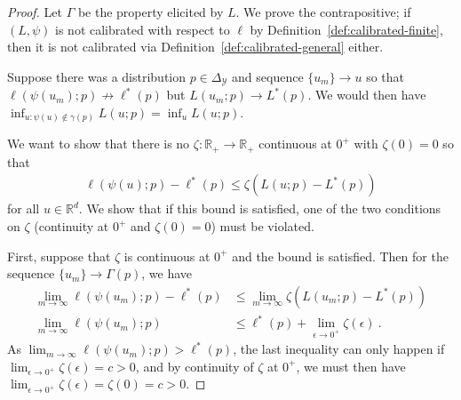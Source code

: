 \documentclass{article}
\newcommand{\reals}{\mathbb{R}}
\newcommand{\simplex}{\Delta_\Y}
\newcommand{\R}{\mathcal{R}}
\newcommand{\Y}{\mathcal{Y}}
\newcommand{\risk}[1]{#1^*}
\begin{document}
\begin{proof}
	Let $\Gamma$ be the property elicited by $L$.
	We prove the contrapositive; if $(L, \psi)$ is not calibrated with respect to $\ell$ by Definition~\ref{def:calibrated-finite}, then it is not calibrated via Definition~\ref{def:calibrated-general} either.
	
	Suppose there was a distribution $p \in \simplex$ and sequence $\{u_m\} \to u$ so that $\ell(\psi(u_m);p) \not \to \risk{\ell}(p)$ but $L(u_m;p) \to \risk{L}(p)$.
	We would then have $\inf_{u : \psi(u) \not \in \gamma(p)} L(u;p) = \inf_{u} L(u;p)$.
	
	We want to show that there is no $\zeta:\reals_+ \to \reals_+$ continuous at $0^+$ with $\zeta(0) = 0$ so that 
	\begin{align*}
	\ell(\psi(u);p) - \risk{\ell}(p) \leq \zeta(L(u;p) - \risk{L}(p))
	\end{align*}
	for all $u \in \reals^d$.
	We show that if this bound is satisfied, one of the two conditions on $\zeta$ (continuity at $0^+$ and $\zeta(0) = 0$) must be violated.
	
	
	First, suppose that $\zeta$ is continuous at $0^+$ and the bound is satisfied.
	Then for the sequence $\{u_m\} \to \Gamma(p)$, we have 
	\begin{align*}
	\lim_{m \to \infty}\ell(\psi(u_m); p) - \risk{\ell}(p)&\leq \lim_{m \to \infty} \zeta(L(u_m; p) - \risk{L}(p))\\
	\lim_{m \to \infty}\ell(\psi(u_m) ; p) &\leq \risk{\ell}(p) + \lim_{\epsilon \to 0^+} \zeta(\epsilon)~.~
	\end{align*}
	As $\lim_{m \to \infty} \ell(\psi(u_m);p) > \risk{\ell}(p)$, the last inequality can only happen if $\lim_{\epsilon \to 0^+} \zeta(\epsilon) = c > 0$, and by continuity of $\zeta$ at $0^+$, we must then have $\lim_{\epsilon \to 0^+} \zeta(\epsilon) = \zeta(0) = c > 0$. 
	
\end{proof}
\end{document}
